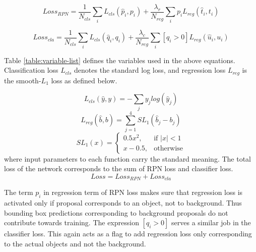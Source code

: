 $$Loss_{RPN}= \frac{1}{N_{cls}}\sum_i L_{cls}(\hat{p}_i,p_i) + \frac{\lambda_r}{N_{reg}}\sum_i p_i L_{reg}(\hat{t}_i,t_i)$$

\begin{small}
$$Loss_{cla} = \frac{1}{N_{cls}}\sum_i L_{cls}(\hat{q}_i,q_i) + \frac{\lambda_c}{N_{reg}}\sum_i [q_i > 0] L_{reg}(\hat{u}_i,u_i)$$
\end{small}
Table \ref{table:variable-list} defines the variables used in the above equations. Classification loss $L_{cls}$ denotes the standard log loss, and regression loss $L_{reg}$ is the smooth-$L_1$ loss as defined below. 

$$ L_{cls}(\hat{y},y) = -\sum_j y_jlog(\hat{y}_j) $$
$$ L_{reg}(\hat{b},b) = \sum_{j=1}^4 SL_1(\hat{b}_j - b_j) $$
$$SL_1(x) = \begin{cases}
0.5x^2, & \text{if } |x|<1 \\
x-0.5,  & \text{otherwise}
\end{cases}
$$
where input parameters to each function carry the standard meaning. The total loss of the network corresponds to the sum of RPN loss and classifier loss.
$$ Loss = Loss_{RPN} + Loss_{cla} $$

The term $p_i$ in regression term of RPN loss makes sure that regression loss is activated only if proposal corresponds to an object, not to background. Thus bounding box predictions corresponding to background proposals do not contribute towards training. The expression $[q_i>0]$ serves a similar job in the classifier loss. This again acts as a flag to add regression loss only corresponding to the actual objects and not the background. 

